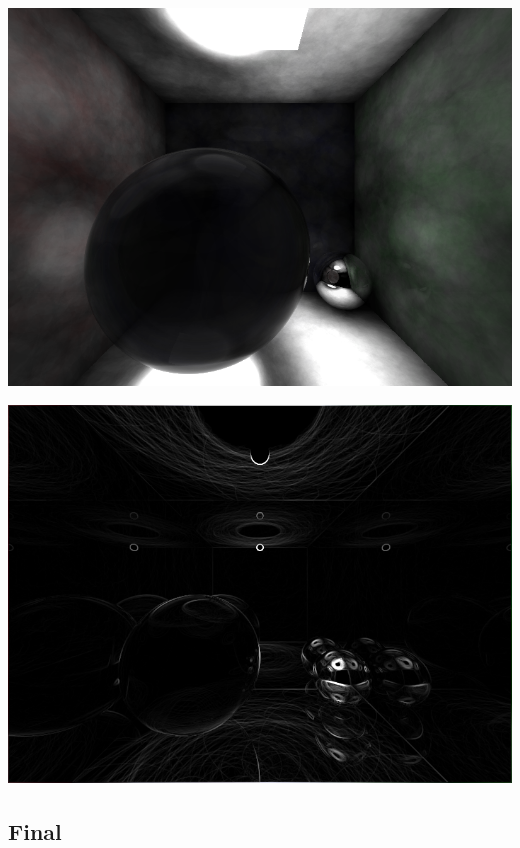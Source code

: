 \documentclass[a4paper]{article}
\begin{document}
\begin{center}
	\includegraphics[scale=0.45]{images/gallery/caustics.png}
	\label{fig:caustics}
\end{center}

\begin{center}
	\includegraphics[scale=0.45]{images/gallery/sobel.png}
	\label{fig:sobel}
\end{center}

\cleardoublepage
\subsection{Final}
\end{document}
